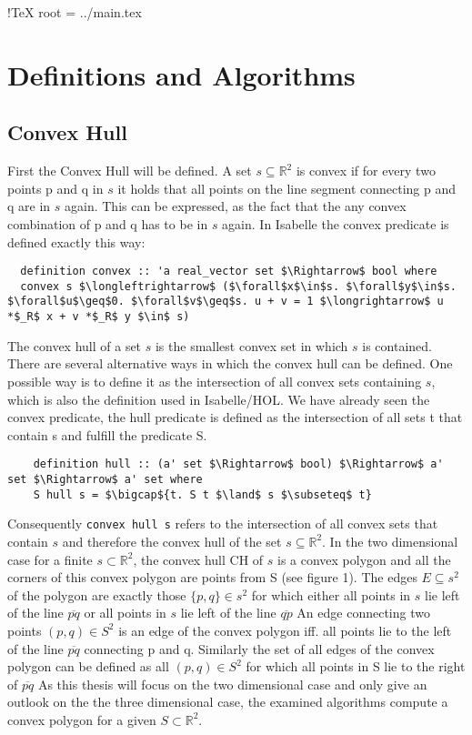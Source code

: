 !TeX root = ../main.tex

\chapter{Definitions and Algorithms}\label{chapter:definitions_algorithms}

\section{Convex Hull}
\label{sec:conv_hull}
First the Convex Hull will be defined. A set $ s \subseteq \mathbb{R}^2 $ is convex if for  every
two points p and q in $s$ it holds that all points on the line segment connecting p and q 
are in $s$ again. This can be expressed, as the fact that the any convex combination of 
p and q has to be in $s$ again. In Isabelle the convex predicate is defined exactly this way:
\begin{lstlisting}
  definition convex :: 'a real_vector set $\Rightarrow$ bool where
  convex s $\longleftrightarrow$ ($\forall$x$\in$s. $\forall$y$\in$s. $\forall$u$\geq$0. $\forall$v$\geq$s. u + v = 1 $\longrightarrow$ u *$_R$ x + v *$_R$ y $\in$ s)
\end{lstlisting}
The convex hull of a set $s$ is the smallest convex set in which $s$ is contained. 
There are several alternative ways in which the convex hull can be defined.
One possible way is to define it as the intersection of all convex sets containing $s$, which 
is also the definition used in Isabelle/HOL. We have already seen the convex predicate, the hull
predicate is defined as the intersection of all sets t that contain s and fulfill the predicate S.
\begin{lstlisting}
    definition hull :: (a' set $\Rightarrow$ bool) $\Rightarrow$ a' set $\Rightarrow$ a' set where
    S hull s = $\bigcap${t. S t $\land$ s $\subseteq$ t}
\end{lstlisting}
Consequently \lstinline|convex hull s| refers to the intersection of all convex sets that 
contain $s$ and therefore the convex hull of the set $ s \subseteq \mathbb{R}^2 $.
In the two dimensional case for a finite $s \subset \mathbb{R}^2$, the convex hull CH of $s$ 
is a convex polygon and all the corners of this convex polygon are points from S (see figure 1). \cite{de2000computational}
The edges $E \subseteq s^2$  of the polygon are exactly those $\{p,q\} \in s^2$ for which 
either all points in $s$ lie left of the line $\overline{pq}$ or all points in $s$ lie left of the 
line $\overline{qp}$
An edge connecting two points $(p,q) \in S^2$  is an edge of the convex polygon iff. all points 
lie to the left of the line $\overline{pq}$ connecting p and q. Similarly the set of all 
edges of the convex polygon can be defined as all $(p,q) \in S^2$ for which
all points in S lie to the right of $\overline{pq}$  
As this thesis will focus on the two dimensional case and only give an outlook on the the 
three dimensional case, the examined algorithms compute a convex polygon for a given $S \subset \mathbb{R}^2$. 



